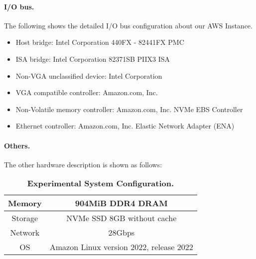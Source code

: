 \paragraph{I/O bus.} The following shows the detailed I/O bus configuration about our AWS Instance.
\begin{itemize}[leftmargin=*]
	\item Host bridge: Intel Corporation 440FX - 82441FX PMC
	\item ISA bridge: Intel Corporation 82371SB PIIX3 ISA 
	\item Non-VGA unclassified device: Intel Corporation
	\item VGA compatible controller: Amazon.com, Inc.
	\item Non-Volatile memory controller: Amazon.com, Inc. NVMe EBS Controller
	\item Ethernet controller: Amazon.com, Inc. Elastic Network Adapter (ENA)
\end{itemize}

\paragraph{Others.} The other hardware description is shown as follows:
\begin{table}[h]
	\centering
	\begin{tabular}{c|c}
		\hline
		Memory & 904MiB DDR4 DRAM \\ \hline
		
		Storage & NVMe SSD 8GB without cache \\ \hline

		Network & 28Gbps \\ \hline
		
		OS & Amazon Linux version 2022, release 2022 \\ \hline
	\end{tabular}
	\caption{\textbf{Experimental System Configuration.}}
	\label{table:sys-conf}
\end{table}


